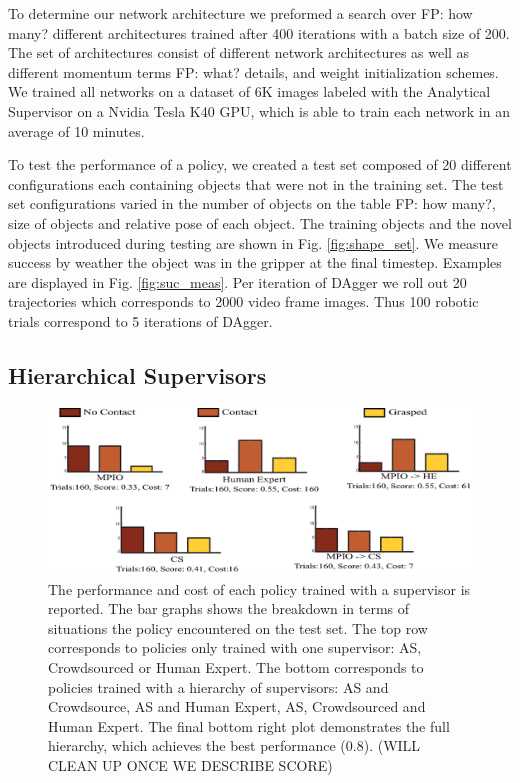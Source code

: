 \documentclass[10pt, conference]{ieeeconf}      %
\begin{document}
To determine our network architecture we preformed a search over {\color{blue} FP: how many?} different architectures trained after 400 iterations with a batch size of 200. The set of architectures consist of different network architectures as well as different momentum
terms { \color{blue} FP: what? details}, and weight initialization schemes. We trained all networks on a dataset of 6K images labeled with the Analytical Supervisor on a Nvidia Tesla K40 GPU, which is able to train each network in an average of 10 minutes.  

To test the performance of a policy, we created a test set composed of 20 different configurations each containing
objects that were not in the training set.  The test set configurations varied in the number of objects on the table
{\color{blue} FP: how many?}, size of objects and relative pose of each object. The training objects and the novel
objects introduced during testing are shown in Fig. \ref{fig:shape_set}.  We measure success by weather the object was
in the gripper at the final timestep. Examples are displayed in Fig. \ref{fig:suc_meas}. 
Per iteration of DAgger we roll out 20 trajectories which corresponds to 2000 video frame images.
Thus 100 robotic trials correspond to 5 iterations of DAgger.

\subsection{Hierarchical Supervisors}

\begin{figure}[t]
\centering
\includegraphics{f_figs/results.eps}

\caption{ \footnotesize The performance and cost of each policy trained with a supervisor is reported. The bar graphs
shows the breakdown in terms of situations the policy encountered on the test set. The top row corresponds to policies
only trained with one supervisor: AS, Crowdsourced or Human Expert. The bottom corresponds to policies trained with a
hierarchy of supervisors: AS and Crowdsource, AS and Human Expert, AS, Crowdsourced and Human Expert. The final bottom right plot demonstrates the full hierarchy, which achieves the best performance (0.8).  (WILL CLEAN UP ONCE WE DESCRIBE SCORE)  }

\label{fig:perf_results}
\end{figure}
\end{document}
